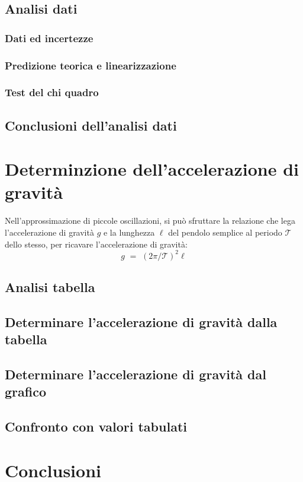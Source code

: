 \documentclass[11pt, twoside, a4paper]{article}
\begin{document}
	\subsection{Analisi dati}
		\subsubsection{Dati ed incertezze}
		
		\subsubsection{Predizione teorica e linearizzazione}
		
		\subsubsection{Test del chi quadro}
		
	\subsection{Conclusioni dell'analisi dati}
	
\newpage
\section{Determinzione dell'accelerazione di gravità}
%
Nell'approssimazione di piccole oscillazioni, si può sfruttare la relazione che lega l'accelerazione di gravità $g$ e la lunghezza $\ell$ del pendolo semplice al periodo $\mathcal{T}$ dello stesso, per ricavare l'accelerazione di gravità:
\begin{equation}
	g \,\, = \,\, (2 \pi / \mathcal{T})^2 \ell
	\label{eq:g}
\end{equation}
	\subsection{Analisi tabella}
	
	\subsection{Determinare l'accelerazione di gravità dalla tabella}
	
	\subsection{Determinare l'accelerazione di gravità dal grafico}
	
	\subsection{Confronto con valori tabulati}
	

\newpage
\section{Conclusioni}

\end{document}
